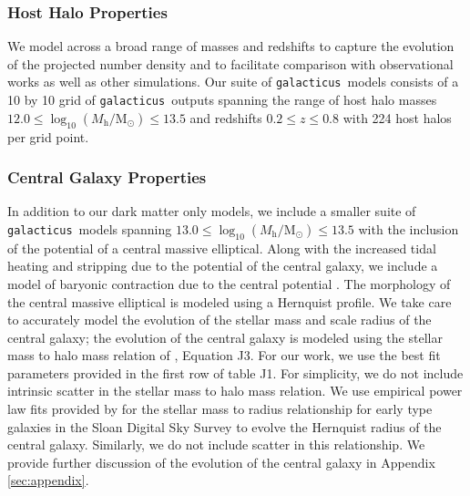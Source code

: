 \documentclass[%
 reprint,
 amsmath,
 amssymb,
 aps,
prd,
twocolumn,
superscriptaddress,
preprintnumbers,
floatfix,
nofootinbib
]{revtex4-2}
\def\gal{{\tt galacticus}~}
\newcommand{\refappendix}[1]{Appendix \ref{#1}}
\begin{document}
\subsubsection{Host Halo Properties}

We model across a broad range of masses and redshifts to capture the evolution of the projected number density and to facilitate comparison with observational works as well as other simulations.
Our suite of \gal models consists of a 10 by 10 grid of \gal outputs spanning the range of host halo masses $12.0 \leq \log_{10}\left( M_{\mathrm{h}}/ \mathrm{M}_\odot \right ) \leq 13.5$ and redshifts $0.2 \leq z \leq 0.8$ with 224 host halos per grid point.

\subsubsection{Central Galaxy Properties}
In addition to our dark matter only models, we include a smaller suite of \gal models spanning $13.0 \leq \log_{10} (M_{\mathrm{h}} / \mathrm{M}_\odot) \leq 13.5$ with the inclusion of the potential of a central massive elliptical.
Along with the increased tidal heating and stripping due to the potential of the central galaxy, we include a model of baryonic contraction due to the central potential \citep{gnedin2004response}.
The morphology of the central massive elliptical is modeled using a Hernquist \citep{hernquist1990analytical} profile.
We take care to accurately model the evolution of the stellar mass and scale radius of the central galaxy; the evolution of the central galaxy is modeled using the stellar mass to halo mass relation of \citet{Behroozi_2019}, Equation J3.
For our work, we use the best fit parameters provided in the first row of table J1.
For simplicity, we do not include intrinsic scatter in the stellar mass to halo mass relation.
We use empirical power law fits provided by \citet{2003MNRAS.343..978S} for the stellar mass to radius relationship for early type galaxies in the Sloan Digital Sky Survey \citep{york2000sloan} to evolve the Hernquist radius of the central galaxy.
Similarly, we do not include scatter in this relationship.
We provide further discussion of the evolution of the central galaxy in \refappendix{sec:appendix}.
\end{document}
